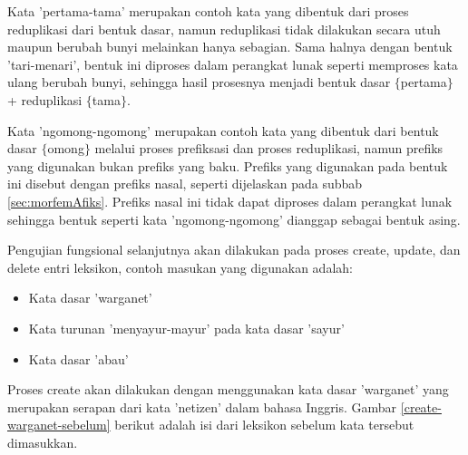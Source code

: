 Kata 'pertama-tama' merupakan contoh kata yang dibentuk dari proses reduplikasi dari bentuk dasar, namun reduplikasi tidak dilakukan secara utuh maupun berubah bunyi melainkan hanya sebagian. Sama halnya dengan bentuk 'tari-menari', bentuk ini diproses dalam perangkat lunak seperti memproses kata ulang berubah bunyi, sehingga hasil prosesnya menjadi bentuk dasar $\lbrace$pertama$\rbrace$ + reduplikasi $\lbrace$tama$\rbrace$.

Kata 'ngomong-ngomong' merupakan contoh kata yang dibentuk dari bentuk dasar $\lbrace$omong$\rbrace$ melalui proses prefiksasi dan proses reduplikasi, namun prefiks yang digunakan bukan prefiks yang baku. Prefiks yang digunakan pada bentuk ini disebut dengan prefiks nasal, seperti dijelaskan pada subbab \ref{sec:morfemAfiks}. Prefiks nasal ini tidak dapat diproses dalam perangkat lunak sehingga bentuk seperti kata 'ngomong-ngomong' dianggap sebagai bentuk asing.

Pengujian fungsional selanjutnya akan dilakukan pada proses create, update, dan delete entri leksikon, contoh masukan yang digunakan adalah:

\begin{itemize}
	\item Kata dasar 'warganet'
	\item Kata turunan 'menyayur-mayur' pada kata dasar 'sayur'
	\item Kata dasar 'abau'
\end{itemize}

Proses create akan dilakukan dengan menggunakan kata dasar 'warganet' yang merupakan serapan dari kata 'netizen' dalam bahasa Inggris. Gambar \ref{create-warganet-sebelum} berikut adalah isi dari leksikon sebelum kata tersebut dimasukkan.

